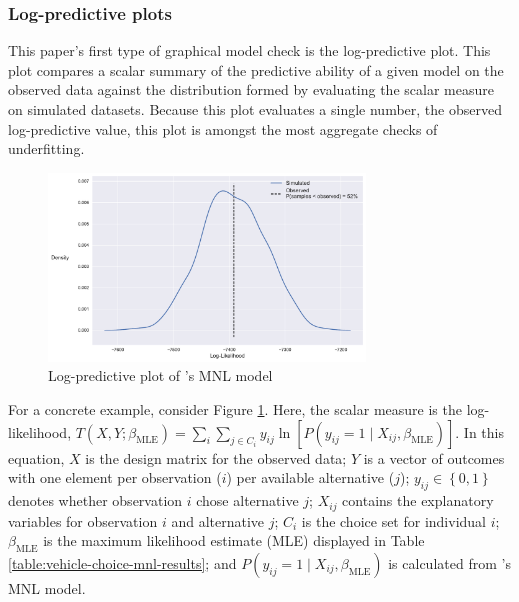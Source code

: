 \documentclass[preprint]{elsarticle}
\begin{document}
\subsubsection{Log-predictive plots}
\label{sec:case1-part1-lp-plots}
This paper's first type of graphical model check is the log-predictive plot. This plot compares a scalar summary of the predictive ability of a given model on the observed data against the distribution formed by evaluating the scalar measure on simulated datasets. Because this plot evaluates a single number, the observed log-predictive value, this plot is amongst the most aggregate checks of underfitting.

\begin{figure}
\centering
\includegraphics[width=0.75\textwidth]{log-predictive-vehicle-choice-mnl}
\caption{Log-predictive plot of \citeauthor{brownstone_forecasting_1998}'s MNL model}
\label{fig:orig-mnl-log-predictive}
\end{figure}

For a concrete example, consider Figure \ref{fig:orig-mnl-log-predictive}. Here, the scalar measure is the log-likelihood, $T \left( X, Y; \beta _{\textrm{MLE}} \right) = \sum _i \sum _{j \in C_i} y_{ij} \ln \left[ P \left( y_{ij} = 1 \mid X_{ij}, \beta _{\textrm{MLE}} \right) \right]$. In this equation, $X$ is the design matrix for the observed data; $Y$ is a vector of outcomes with one element per observation ($i$) per available alternative ($j$); $y_{ij} \in \left\lbrace 0, 1 \right\rbrace$ denotes whether observation $i$ chose alternative $j$; $X_{ij}$ contains the explanatory variables for observation $i$ and alternative $j$; $C_i$ is the choice set for individual $i$; $\beta _{\textrm{MLE}}$ is the maximum likelihood estimate (MLE) displayed in Table \ref{table:vehicle-choice-mnl-results}; and $P \left( y_{ij} = 1 \mid X_{ij}, \beta _{\textrm{MLE}} \right)$ is calculated from \citeauthor{brownstone_forecasting_1998}'s MNL model.
\end{document}
